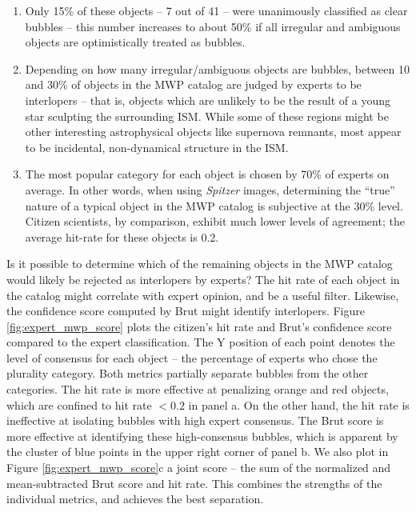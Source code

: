 \documentclass[preprint]{aastex}
\begin{document}
\begin{enumerate} 
\item Only 15\% of these objects -- 7 out of 41 -- were unanimously classified as clear bubbles -- this number increases to about 50\% if all irregular and ambiguous objects are optimistically treated as bubbles. 
\item Depending on how many irregular/ambiguous objects are bubbles, between 10 and 30\% of objects in the MWP catalog are judged by experts to be interlopers -- that is, objects which are unlikely to be the result of a young star sculpting the surrounding ISM. While some of these regions might be other interesting astrophysical objects like supernova remnants, most appear to be incidental, non-dynamical structure in the ISM.
\item The most popular category for each object is chosen by 70\% of experts on average. In other words, when using \emph{Spitzer} images, determining the ``true'' nature of a typical object in the MWP catalog is subjective at the 30\% level. Citizen scientists, by comparison, exhibit much lower levels of agreement; the average hit-rate for these objects is 0.2. 
\end{enumerate}

Is it possible to determine which of the remaining objects in the MWP catalog would likely be rejected as interlopers by experts? The hit rate of each object in the catalog might correlate with expert opinion, and be a useful filter. Likewise, the confidence score computed by Brut might identify interlopers. Figure \ref{fig:expert_mwp_score} plots the citizen's hit rate and Brut's confidence score compared to the expert classification. The Y position of each point denotes the level of consensus for each object -- the percentage of experts who chose the plurality category. Both metrics partially separate bubbles from the other categories. The hit rate is more effective at penalizing orange and red objects, which are confined to hit rate $<0.2$ in panel a. On the other hand, the hit rate is ineffective at isolating bubbles with high expert consensus. The Brut score is more effective at identifying these high-consensus bubbles, which is apparent by the cluster of blue points in the upper right corner of panel b. We also plot in Figure \ref{fig:expert_mwp_score}c a joint score -- the sum of the normalized and mean-subtracted Brut score and hit rate.  This combines the strengths of the individual metrics, and achieves the best separation.
\end{document}
